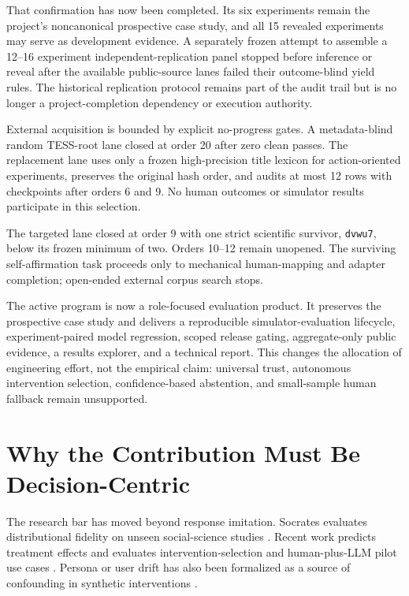 \documentclass[11pt]{article}
\begin{document}
That confirmation has now been completed. Its six experiments remain the
project's noncanonical prospective case study, and all 15 revealed experiments
may serve as development evidence. A separately frozen attempt to assemble a
12--16 experiment independent-replication panel stopped before inference or
reveal after the available public-source lanes failed their outcome-blind yield
rules. The historical replication protocol remains part of the audit trail but
is no longer a project-completion dependency or execution authority.

External acquisition is bounded by explicit no-progress gates. A
metadata-blind random TESS-root lane closed at order 20 after zero clean passes.
The replacement lane uses only a frozen high-precision title lexicon for
action-oriented experiments, preserves the original hash order, and audits at
most 12 rows with checkpoints after orders 6 and 9. No human outcomes or
simulator results participate in this selection.

The targeted lane closed at order 9 with one strict scientific survivor,
\texttt{dvwu7}, below its frozen minimum of two. Orders 10--12 remain
unopened. The surviving self-affirmation task proceeds only to mechanical
human-mapping and adapter completion; open-ended external corpus search stops.

The active program is now a role-focused evaluation product. It preserves the
prospective case study and delivers a reproducible simulator-evaluation
lifecycle, experiment-paired model regression, scoped release gating,
aggregate-only public evidence, a results explorer, and a technical report.
This changes the allocation of engineering effort, not the empirical claim:
universal trust, autonomous intervention selection, confidence-based
abstention, and small-sample human fallback remain unsupported.

\section{Why the Contribution Must Be Decision-Centric}

The research bar has moved beyond response imitation. Socrates evaluates distributional fidelity on unseen social-science studies \cite{kolluri2025}. Recent work predicts treatment effects and evaluates intervention-selection and human-plus-LLM pilot use cases \cite{ashokkumar2026}. Persona or user drift has also been formalized as a source of confounding in synthetic interventions \cite{lin2026}.
\end{document}

